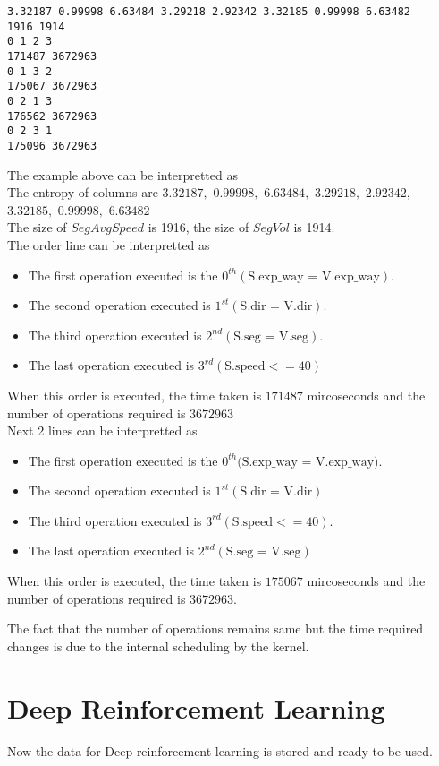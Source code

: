\begin{lstlisting}[caption=Data for DQN]
3.32187 0.99998 6.63484 3.29218 2.92342 3.32185 0.99998 6.63482 
1916 1914
0 1 2 3 
171487 3672963
0 1 3 2 
175067 3672963
0 2 1 3 
176562 3672963
0 2 3 1 
175096 3672963
\end{lstlisting}
The example above can be interpretted as\\
The entropy of columns are $3.32187,$ $0.99998,$ $6.63484,$ $3.29218,$ $2.92342,$ $3.32185,$ $0.99998,$ $6.63482$\\
The size of $SegAvgSpeed$ is 1916, the size of $SegVol$ is 1914.\\
The order line can be interpretted as
\begin{itemize} 
    \item The first operation executed is the $0^{th}(\text{S.exp\_way = V.exp\_way})$.
    \item The second operation executed is $1^{st}(\text{S.dir = V.dir})$.
    \item The third operation executed is $2^{nd}(\text{S.seg = V.seg})$.
    \item The last operation executed is $3^{rd}(\text{S.speed} <= 40)$
\end{itemize} 
When this order is executed, the time taken is $171487$ mircoseconds and the number of operations required is $3672963$\\
Next 2 lines can be interpretted as 
\begin{itemize}
    \item The first operation executed is the $0^{th}($$\text{S.exp\_way = V.exp\_way})$.
    \item The second operation executed is $1^{st}(\text{S.dir = V.dir})$.
    \item The third operation executed is $3^{rd}(\text{S.speed} <= 40)$.
    \item The last operation executed is $2^{nd}(\text{S.seg = V.seg})$
\end{itemize} 
When this order is executed, the time taken is $175067$ mircoseconds and the number of operations required is $3672963$. 
\par The fact that the number of operations remains same but the time required changes is due to the internal scheduling by the kernel.

\section{Deep Reinforcement Learning}
Now the data for Deep reinforcement learning is stored and ready to be used.

